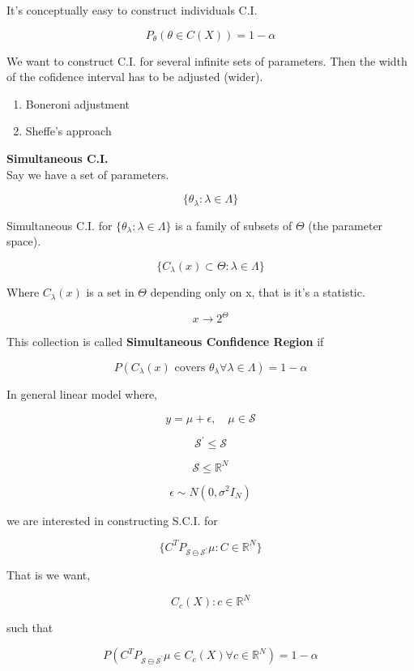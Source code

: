 \documentclass[11pt,fleqn]{book} %
\begin{document}
It's conceptually easy to construct individuals C.I.

$$P_\theta (\theta \in C(X)) = 1 - \alpha $$

We want to construct C.I. for several infinite sets of parameters. Then the width of the cofidence interval has to be adjusted (wider). 

\begin{enumerate}
	\item Boneroni adjustment
	\item Sheffe's approach
\end{enumerate}

\textbf{Simultaneous C.I.}\\

Say we have a set of parameters. 

		$$\{\theta_\lambda : \lambda \in \Lambda \} $$

Simultaneous C.I. for $\{\theta_\lambda : \lambda \in \Lambda \} $ is a family of subsets of $\Theta$ (the parameter space).

		$$\{C_\lambda(x) \subset \Theta : \lambda \in \Lambda \} $$ 

Where $C_\lambda(x)$ is a set in $\Theta$ depending only on x, that is it's a statistic.

		$$x \rightarrow 2^\Theta $$

This collection is called \textbf{Simultaneous Confidence Region} if 

		$$P(C_\lambda(x) \text{ covers } \theta_\lambda \forall \lambda \in \Lambda) = 1 - \alpha $$



In general linear model where,

		$$y = \mu + \epsilon, \quad \mu \in \mathcal{S} $$

		$$\mathcal{S}^\prime \leq \mathcal{S} $$

		$$\mathcal{S} \leq \mathbb{R}^N $$

		$$\epsilon \sim N(0, \sigma^2 I_N)$$

we are interested in constructing S.C.I. for

		$$\{C^T P_{\mathcal{S} \ominus \mathcal{S}^\prime}\mu: C \in \mathbb{R}^N \}$$

That is we want, 

		$$C_c(X): c \in \mathbb{R}^N$$

such that

		$$P(C^T P_{\mathcal{S} \ominus \mathcal{S}^\prime}\mu \in C_c(X) \forall c \in \mathbb{R}^N ) = 1 - \alpha$$
\end{document}
